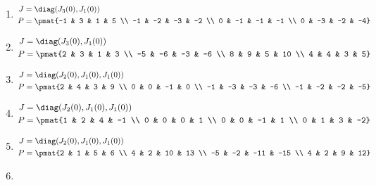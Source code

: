 \begin{enumerate}
\item

\begin{align*}
J &= \diag(J_{3}(0), J_{1}(0))\\
P &= \pmat{-1 & 3 & 1 & 5 \\ -1 & -2 & -3 & -2 \\ 0 & -1 & -1 & -1 \\ 0 & -3 & -2 & -4}
\end{align*}

\item

\begin{align*}
J &= \diag(J_{3}(0), J_{1}(0))\\
P &= \pmat{2 & 3 & 1 & 3 \\ -5 & -6 & -3 & -6 \\ 8 & 9 & 5 & 10 \\ 4 & 4 & 3 & 5}
\end{align*}

\item

\begin{align*}
J &= \diag(J_{2}(0), J_{1}(0), J_{1}(0))\\
P &= \pmat{2 & 4 & 3 & 9 \\ 0 & 0 & -1 & 0 \\ -1 & -3 & -3 & -6 \\ -1 & -2 & -2 & -5}
\end{align*}

\item

\begin{align*}
J &= \diag(J_{2}(0), J_{1}(0), J_{1}(0))\\
P &= \pmat{1 & 2 & 4 & -1 \\ 0 & 0 & 0 & 1 \\ 0 & 0 & -1 & 1 \\ 0 & 1 & 3 & -2}
\end{align*}

\item

\begin{align*}
J &= \diag(J_{2}(0), J_{1}(0), J_{1}(0))\\
P &= \pmat{2 & 1 & 5 & 6 \\ 4 & 2 & 10 & 13 \\ -5 & -2 & -11 & -15 \\ 4 & 2 & 9 & 12}
\end{align*}

\item


\end{enumerate}
